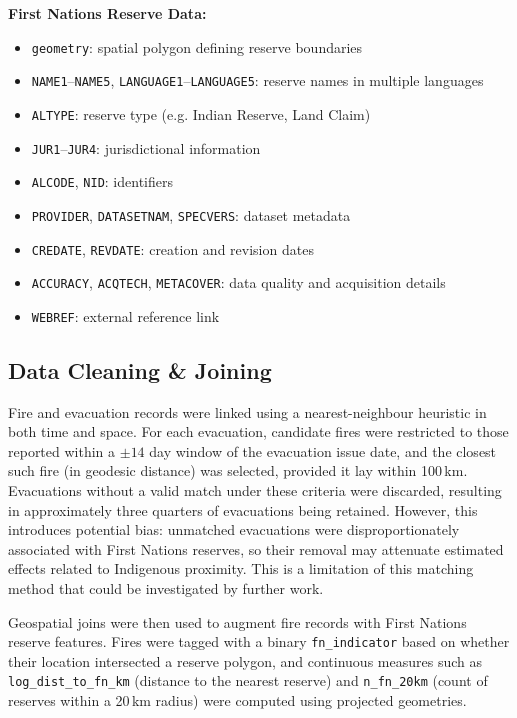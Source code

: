 \textbf{First Nations Reserve Data:}\cite{reservesdb}
\begin{itemize}
    \item \texttt{geometry}: spatial polygon defining reserve boundaries
    \item \texttt{NAME1}–\texttt{NAME5}, \texttt{LANGUAGE1}–\texttt{LANGUAGE5}: reserve names in multiple languages
    \item \texttt{ALTYPE}: reserve type (e.g. Indian Reserve, Land Claim)
    \item \texttt{JUR1}–\texttt{JUR4}: jurisdictional information
    \item \texttt{ALCODE}, \texttt{NID}: identifiers
    \item \texttt{PROVIDER}, \texttt{DATASETNAM}, \texttt{SPECVERS}: dataset metadata
    \item \texttt{CREDATE}, \texttt{REVDATE}: creation and revision dates
    \item \texttt{ACCURACY}, \texttt{ACQTECH}, \texttt{METACOVER}: data quality and acquisition details
    \item \texttt{WEBREF}: external reference link
\end{itemize}

\subsection{Data Cleaning \& Joining}

Fire and evacuation records were linked using a nearest-neighbour heuristic in both time and space. For each evacuation, candidate fires were restricted to those reported within a $\pm14$ day window of the evacuation issue date, and the closest such fire (in geodesic distance) was selected, provided it lay within 100\,km. Evacuations without a valid match under these criteria were discarded, resulting in approximately three quarters of evacuations being retained. However, this introduces potential bias: unmatched evacuations were disproportionately associated with First Nations reserves, so their removal may attenuate estimated effects related to Indigenous proximity. This is a limitation of this matching method that could be investigated by further work.

Geospatial joins were then used to augment fire records with First Nations reserve features. Fires were tagged with a binary \texttt{fn\_indicator} based on whether their location intersected a reserve polygon, and continuous measures such as \texttt{log\_dist\_to\_fn\_km} (distance to the nearest reserve) and \texttt{n\_fn\_20km} (count of reserves within a 20\,km radius) were computed using projected geometries.

